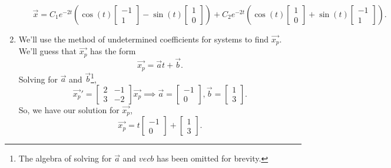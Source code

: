 \begin{enumerate}[label=\arabic*.]
\begin{enumerate}[label=(\alph*)]
					\begin{equation*}
						\vec{x} = C_1e^{-2t}\left(\cos{(t)}\begin{bmatrix}
							-1 \\
							1
						\end{bmatrix} - \sin{(t)}\begin{bmatrix}
							1 \\
							0
						\end{bmatrix}\right) + C_2e^{-2t}\left(\cos{(t)}\begin{bmatrix}
							1 \\
							0
						\end{bmatrix} + \sin{(t)}\begin{bmatrix}
							-1 \\
							1
						\end{bmatrix}
						\right).
					\end{equation*}
			\end{enumerate}
		\item
			We'll use the method of undetermined coefficients for systems to find $\vec{x_p}$.
			We'll guess that $\vec{x_p}$ has the form
			\begin{equation*}
				\vec{x_p} = \vec{a}t + \vec{b}.
			\end{equation*}
			Solving for $\vec{a}$ and $\vec{b}$\footnote{The algebra of solving for $\vec{a}$ and $vec{b}$ has been omitted for brevity.},
			\begin{equation*}
				\vec{x_p}' = \begin{bmatrix}
					2 & -1 \\
					3 & -2
				\end{bmatrix}\vec{x_p} \implies \vec{a} = \begin{bmatrix}
					-1 \\
					0
				\end{bmatrix}, \vec{b} = \begin{bmatrix}
					1 \\
					3
				\end{bmatrix}.
			\end{equation*}
			So, we have our solution for $\vec{x_p}$,
			\begin{equation*}
				\vec{x_p} = t\begin{bmatrix}
					-1 \\
					0
				\end{bmatrix} + \begin{bmatrix}
					1 \\
					3
				\end{bmatrix}.

\end{equation*}
\end{enumerate}
